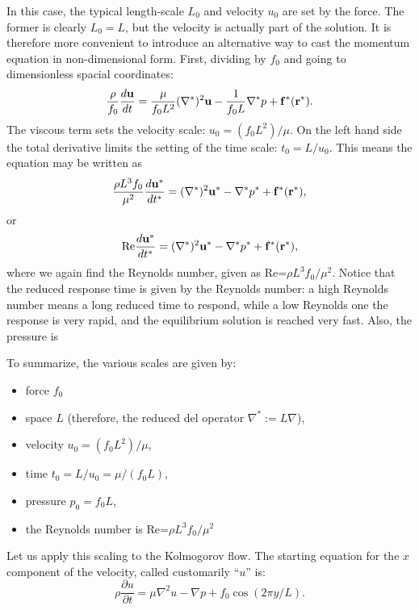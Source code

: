 In this case, the typical length-scale $L_0$ and velocity $u_0$ are
set by the force. The former is clearly $L_0=L$, but the velocity is
actually part of the solution. It is therefore more convenient to
introduce an alternative way to cast the momentum equation in
non-dimensional form. First, dividing by $f_0$ and going to
dimensionless spacial coordinates:
\begin{equation}
\label{eq:Navier-Stokes_nondim1}
\frac{\rho}{f_0}
\frac{d \mathbf{u}}{d t} =
\frac\mu{f_0 L^2} (\nabla^*)^2 \mathbf{u}
-\frac 1{f_0 L} \nabla^* p + \mathbf{f}^*(\mathbf{r}^*) .
\end{equation}
The viscous term sets the velocity scale: $u_0 = ( f_0 L^2 ) / \mu $.
On the left hand side the total derivative limits the setting of the
time scale: $t_0=L/u_0$. This means the equation may be written as
\[
\frac{\rho L^3 f_0}{\mu^2}
\frac{d \mathbf{u}^*}{d t^*} =
(\nabla^*)^2 \mathbf{u}^*
-\nabla^* p^* + \mathbf{f}^*(\mathbf{r}^*) ,
\]
or
\begin{equation}
\label{eq:Navier-Stokes_nondim2}
\mathrm{Re}
\frac{d \mathbf{u}^*}{d t^*} =
(\nabla^*)^2 \mathbf{u}^*
-\nabla^* p^* + \mathbf{f}^*(\mathbf{r}^*) ,
\end{equation}
where we again find the Reynolds number, given as Re=$\rho L^3 f_0 /
\mu^2$.  Notice that the reduced response time is given by the
Reynolds number: a high Reynolds number means a long reduced time to
respond, while a low Reynolds one the response is very rapid, and the
equilibrium solution is reached very fast. Also, the pressure
is

To summarize, the various scales are given by:
\begin{itemize}
\item force $f_0$
\item space $L$ (therefore, the reduced del operator $\nabla^* :=
  L \nabla$),
\item velocity $u_0 = ( f_0 L^2 ) / \mu $,
\item time $t_0 = L / u_0 = \mu / (f_0 L) $,
\item pressure $p_0= f_0 L $,
\item the Reynolds number is Re=$\rho L^3 f_0 / \mu^2$
\end{itemize}


Let us apply this scaling to the Kolmogorov flow. The starting
equation for the $x$ component of the velocity, called customarily
``$u$'' is:
\begin{equation}
\label{eq:Kolmo_orig}
  \rho \frac{\partial u}{\partial t} =
  \mu \nabla^2 u - \nabla p +   f_0 \cos(2\pi y/L)  .
\end{equation}

